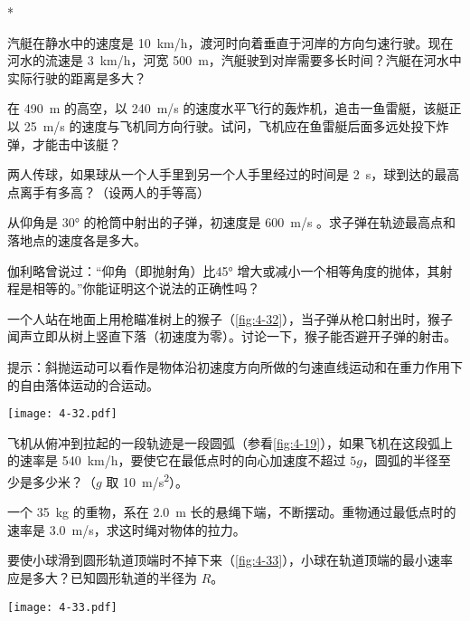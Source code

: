 \begin{Exercise}*
\begin{question}
	\item 汽艇在静水中的速度是 \qty{10}{km/h}，渡河时向着垂直于河岸的方向匀速行驶。现在河水的流速是 \qty{3}{km/h}，河宽 \qty{500}{m}，汽艇驶到对岸需要多长时间？汽艇在河水中实际行驶的距离是多大？
  \item 在 \qty{490}{m} 的高空，以 \qty{240}{m/s} 的速度水平飞行的轰炸机，追击一鱼雷艇，该艇正以 \qty{25}{m/s} 的速度与飞机同方向行驶。试问，飞机应在鱼雷艇后面多远处投下炸弹，才能击中该艇？
  \item 两人传球，如果球从一个人手里到另一个人手里经过的时间是 \qty{2}{s}，球到达的最高点离手有多高？（设两人的手等高）
  \item 从仰角是 \ang{30} 的枪筒中射出的子弹，初速度是 \qty{600}{m/s} 。求子弹在轨迹最高点和落地点的速度各是多大。
  \item 伽利略曾说过：“仰角（即抛射角）比\ang{45} 增大或减小一个相等角度的抛体，其射程是相等的。”你能证明这个说法的正确性吗？
\item 一个人站在地面上用枪瞄准树上的猴子（\cref{fig:4-32}），当子弹从枪口射出时，猴子闻声立即从树上竖直下落（初速度为零）。讨论一下，猴子能否避开子弹的射击。

提示：斜抛运动可以看作是物体沿初速度方向所做的匀速直线运动和在重力作用下的自由落体运动的合运动。

\begin{figurehere}
  \texttt{[image: 4-32.pdf]}
  \label{fig:4-32}
\end{figurehere}

\item  飞机从俯冲到拉起的一段轨迹是一段圆弧（参看\cref{fig:4-19}），如果飞机在这段弧上的速率是 \qty{540}{km/h}，要使它在最低点时的向心加速度不超过 $5g$，圆弧的半径至少是多少米？（$g$ 取 \qty{10}{m/s^2}）。
\item  一个 \qty{35}{kg} 的重物，系在 \qty{2.0}{m} 长的悬绳下端，不断摆动。重物通过最低点时的速率是 \qty{3.0}{m/s}，求这时绳对物体的拉力。
\item  要使小球滑到圆形轨道顶端时不掉下来（\cref{fig:4-33}），小球在轨道顶端的最小速率应是多大？已知圆形轨道的半径为 $R$。
\begin{figurehere}
  \begin{minipage}{\linewidth}\centering
    \texttt{[image: 4-33.pdf]}
    \label{fig:4-33}
  \end{minipage}
\end{figurehere}


\end{question}
\end{Exercise}

